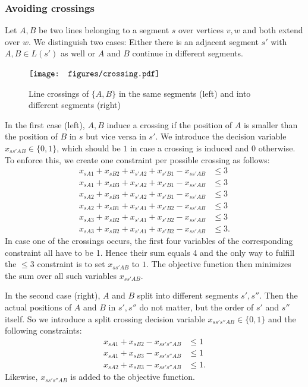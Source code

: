 \documentclass{llncs}
\begin{document}
\subsubsection{Avoiding crossings}\label{SEC:ac}
Let $A, B$ be two lines belonging to a segment $s$ over vertices $v,w$ and both extend over $w$. We distinguish two cases: Either there is an adjacent segment $s'$ with $A,B \in L(s')$ as well or $A$ and $B$ continue in different segments.
\begin{figure}
  \centering
	$\vcenter{\hbox{\texttt{[image: figures/crossing.pdf]}}}$
	\caption{Line crossings of $\{A, B\}$ in the same segments (left) and into different segments (right) }
	\label{FIG:crossings}
\end{figure}
In the first case (left), $A, B$ induce a crossing if the position of $A$ is smaller than the position of $B$ in $s$ but vice versa in $s'$. We introduce the decision variable $x_{ss'AB} \in \{0,1\}$, which should be $1$ in case a crossing is induced and $0$ otherwise. To enforce this, we create one constraint per possible crossing as follows:
\begin{align*}
	x_{sA1} + x_{sB2} + x_{s'A2} + x_{s'B1} - x_{ss'AB} &\leq 3 \\
	x_{sA1} + x_{sB3} + x_{s'A2} + x_{s'B1} - x_{ss'AB} &\leq 3 \\
	x_{sA2} + x_{sB3} + x_{s'A2} + x_{s'B1} - x_{ss'AB} &\leq 3 \\
	x_{sA2} + x_{sB1} + x_{s'A1} + x_{s'B2} - x_{ss'AB} &\leq 3 \\
	x_{sA3} + x_{sB2} + x_{s'A1} + x_{s'B2} - x_{ss'AB} &\leq 3 \\
	x_{sA3} + x_{sB2} + x_{s'A1} + x_{s'B2} - x_{ss'AB} &\leq 3.
\end{align*}
In case one of the crossings occurs, the first four variables of the corresponding constraint all have to be 1. Hence their sum equals 4 and the only way to fulfill the $\leq 3$ constraint is to set $x_{ss'AB}$ to $1$. 
The objective function then minimizes the sum over all such variables $x_{ss'AB}$.

In the second case (right), $A$ and $B$ split into different segments $s', s''$. Then the actual positions of $A$ and $B$ in $s', s''$ do not matter, but the order of $s'$ and $s''$ itself. So we introduce a split crossing decision variable $x_{ss's''AB} \in \{0,1\}$ and the following constraints:
\begin{align*}
	x_{sA1} + x_{sB2} - x_{ss's''AB} &\leq 1 \\
	x_{sA1} + x_{sB3} - x_{ss's''AB} &\leq 1 \\
	x_{sA2} + x_{sB3} - x_{ss's''AB} &\leq 1.
\end{align*}
Likewise, $x_{ss's''AB}$ is added to the objective function.
\end{document}
